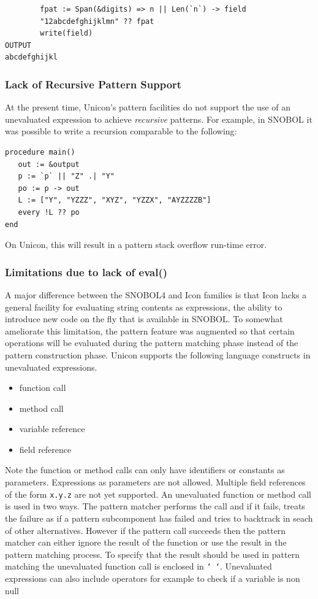 \documentclass[letterpaper,12pt]{article}
\begin{document}
\begin{verbatim}
        fpat := Span(&digits) => n || Len(`n`) -> field        
        "12abcdefghijklmn" ?? fpat
        write(field)
OUTPUT
abcdefghijkl
\end{verbatim}

\subsubsection{Lack of Recursive Pattern Support}

At the present time, Unicon's pattern facilities do not support
the use of an unevaluated expression to achieve {\em recursive}
patterns.  For example, in SNOBOL it was possible to write a
recursion comparable to the following:

\begin{verbatim}
procedure main()
   out := &output
   p := `p` || "Z" .| "Y"
   po := p -> out
   L := ["Y", "YZZZ", "XYZ", "YZZX", "AYZZZZB"]
   every !L ?? po
end
\end{verbatim}

\noindent
On Unicon, this will result in a pattern stack overflow run-time error.


\subsubsection{Limitations due to lack of eval()}

A major difference between the SNOBOL4 and Icon families is that Icon
lacks a general facility for evaluating string contents as
expressions, the ability to introduce new code on the fly that is
available in SNOBOL. To somewhat ameliorate
this limitation, the pattern feature was augmented so that certain
operations will be evaluated during the pattern matching phase instead
of the pattern construction phase.  Unicon supports the following
language constructs in unevaluated expressions.

\begin{itemize}
\item function call
\item method call
\item variable reference
\item field reference
\end{itemize}

Note the function or method calls can only have identifiers or
constants as parameters. Expressions as parameters are not
allowed. Multiple field references of the form \texttt{x.y.z} are
not yet supported. An unevaluated function or method call is used in two
ways. The pattern matcher performs the call and if it fails, treats the
failure as if a pattern subcomponent has failed and tries to
backtrack in seach of other alternatives. However if the pattern call
succeeds then the pattern matcher can either ignore the result of the
function or use the result in the pattern matching process. To specify
that the result should be used in pattern matching the unevaluated
function call is enclosed in \texttt{` `}.  Unevaluated expressions
can also include operators for example to check if a variable is non
null
\end{document}
